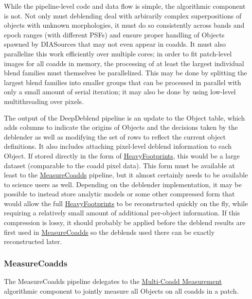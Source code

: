 While the pipeline-level code and data flow is simple, the algorithmic component is not.  Not only must deblending deal with arbirarily complex superpositions of objects with unknown morphologies, it must do so consistently across bands and epoch ranges (with different PSFs) and ensure proper handling of Objects spawned by DIASources that may not even appear in coadds.  It must also parallelize this work efficiently over multiple cores; in order to fit patch-level images for all coadds in memory, the processing of at least the largest individual blend families must themselves be parallelized.  This may be done by splitting the largest blend families into smaller groups that can be processed in parallel with only a small amount of serial iteration; it may also be done by using low-level multithreading over pixels.

The output of the DeepDeblend pipeline is an update to the Object table, which adds columns to indicate the origins of Objects and the decisions taken by the deblender as well as modifying the set of rows to reflect the current object definitions.  It also includes attaching pixel-level deblend information to each Object.  If stored directly in the form of \hyperref[sec:spFootprintsHeavy]{HeavyFootprints}, this would be a large dataset (comparable to the coadd pixel data).  This form must be available at least to the \hyperref[sec:drpMeasureCoadds]{MeasureCoadds} pipeline, but it almost certainly needs to be available to science users as well.  Depending on the deblender implementation, it may be possible to instead store analytic models or some other compressed form that would allow the full \hyperref[sec:drpFootprintsHeavy]{HeavyFootprints} to be reconstructed quickly on the fly, while requiring a relatively small amount of additional per-object information.  If this compression is lossy, it should probably be applied before the deblend results are first used in \hyperref[sec:drpMeasureCoadds]{MeasureCoadds} so the deblends used there can be exactly reconstructed later.

\subsubsection{MeasureCoadds}
\label{sec:drpMeasureCoadds}

The MeasureCoadds pipeline delegates to the \hyperref[sec:acMultiCoaddMeasurement]{Multi-Coadd Measurement} algorithmic component to jointly measure all Objects on all coadds in a patch.

